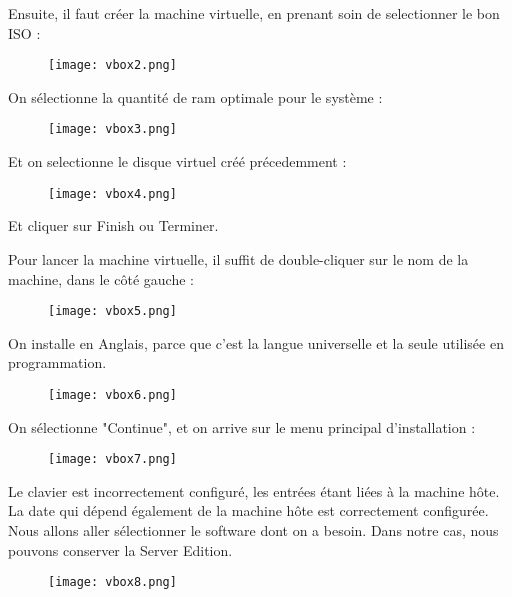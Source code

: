 \documentclass{article}
\begin{document}
Ensuite, il faut créer la machine virtuelle, en prenant soin de selectionner le bon ISO :

\begin{figure}[h!]
		\centering
		\texttt{[image: vbox2.png]}
\end{figure}

\newpage

On sélectionne la quantité de ram optimale pour le système :

\begin{figure}[h!]
		\centering
		\texttt{[image: vbox3.png]}
\end{figure}

Et on selectionne le disque virtuel créé précedemment :

\begin{figure}[h!]
		\centering
		\texttt{[image: vbox4.png]}
\end{figure}

Et cliquer sur Finish ou Terminer.

\pagebreak

Pour lancer la machine virtuelle, il suffit de double-cliquer sur le nom de la machine, dans le côté gauche : 

\begin{figure}[h!]
		\centering
		\texttt{[image: vbox5.png]}
\end{figure}

On installe en Anglais, parce que c'est la langue universelle et la seule utilisée en programmation.

\begin{figure}[h!]
		\centering
		\texttt{[image: vbox6.png]}
\end{figure}

\pagebreak
On sélectionne "Continue", et on arrive sur le menu principal d'installation :

\begin{figure}[h!]
		\centering
		\texttt{[image: vbox7.png]}
\end{figure}

Le clavier est incorrectement configuré, les entrées étant liées à la machine hôte.
La date qui dépend également de la machine hôte est correctement configurée.
Nous allons aller sélectionner le software dont on a besoin.
Dans notre cas, nous pouvons conserver la Server Edition.

\begin{figure}[h!]
		\centering
		\texttt{[image: vbox8.png]}
\end{figure}
\pagebreak
\end{document}
